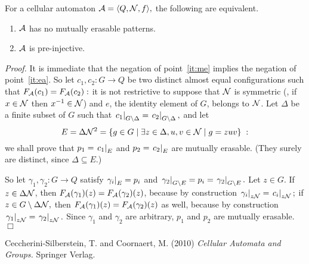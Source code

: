 \documentclass[12pt]{article}
\begin{document}
\begin{lemma} \label{lem:me}
For a cellular automaton
\begin{math}
\mathcal{A} = \langle Q, \mathcal{N}, f \rangle,
\end{math}
the following are equivalent.
\begin{enumerate}
\item \label{it:me}
$\mathcal{A}$ has no mutually erasable patterns.
\item \label{it:ea}
$\mathcal{A}$ is pre-injective.
\end{enumerate}
\end{lemma}
\textit{Proof.}
It is immediate that the negation of point~\ref{it:me}
implies the negation of point~\ref{it:ea}.
So let
\begin{math}
c_1,c_2 : G \to Q
\end{math}
be two distinct almost equal configurations such that
\begin{math}
F_{\mathcal{A}}(c_1) = F_{\mathcal{A}}(c_2):
\end{math}
it is not restrictive to suppose that
$\mathcal{N}$ is symmetric
(\ie, if $x \in \mathcal{N}$ then $x^{-1} \in \mathcal{N}$)
and $e$, the identity element of $G$, belongs to $\mathcal{N}$.
Let $\Delta$ be a finite subset of $G$ such that
\begin{math}
\left.{c_1}\right|_{G \setminus \Delta} = \left.{c_2}\right|_{G \setminus \Delta},
\end{math}
and let
\begin{equation}
E = \Delta \mathcal{N}^2
  = \{ g \in G
       \mid \exists z \in \Delta, u,v \in \mathcal{N}
       \mid g = zuv
    \} \;:
\end{equation}
we shall prove that
\begin{math}
p_1 = \left.{c_1}\right|_{E}
\end{math}
and
\begin{math}
p_2 = \left.{c_2}\right|_{E}
\end{math}
are mutually erasable.
(They surely are distinct, since $\Delta \subseteq E$.)

So let $\gamma_1,\gamma_2 : G \to Q$ satisfy
\begin{math}
\left.{\gamma_i}\right|_{E} = p_i
\end{math}
and
\begin{math}
\left.{\gamma_2}\right|_{G \setminus E} = p_i = \left.{\gamma_2}\right|_{G \setminus E}.
\end{math}
Let $z \in G$.
If $z \in \Delta\mathcal{N}$,
then $F_{\mathcal{A}}(\gamma_1)(z) = F_{\mathcal{A}}(\gamma_2)(z)$,
because by construction
\begin{math}
\left.{\gamma_i}\right|_{z\mathcal{N}} = \left.{c_i}\right|_{z\mathcal{N}};
\end{math}
if
\begin{math}
z \in G \setminus \Delta\mathcal{N},
\end{math}
then $F_{\mathcal{A}}(\gamma_1)(z) = F_{\mathcal{A}}(\gamma_2)(z)$ as well,
because by construction
\begin{math}
\left.{\gamma_1}\right|_{z\mathcal{N}} = \left.{\gamma_2}\right|_{z\mathcal{N}}.
\end{math}
Since $\gamma_1$ and $\gamma_2$ are arbitrary,
$p_1$ and $p_2$ are mutually erasable.
\hfill $\Box$

\begin{thebibliography}{99}

Ceccherini-Silberstein, T. and Coornaert, M. (2010)
\textit{Cellular Automata and Groups.}
Springer Verlag.

\end{thebibliography}

\end{document}
